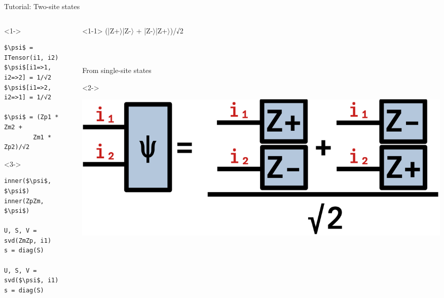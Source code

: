 \begin{frame}[fragile]{Tutorial: Two-site states}

\begin{columns}

\begin{column}{5cm}

\begin{onlyenv}<1->
\begin{lstlisting}[language=JuliaLocal, style=julia, mathescape, basicstyle=\small]
$\psi$ = ITensor(i1, i2)
$\psi$[i1=>1, i2=>2] = 1/√2
$\psi$[i1=>2, i2=>1] = 1/√2

$\psi$ = (Zp1 * Zm2 +
        Zm1 * Zp2)/√2
\end{lstlisting}
\end{onlyenv}

\begin{onlyenv}<3->
\begin{lstlisting}[language=JuliaLocal, style=julia, mathescape, basicstyle=\small]
inner($\psi$, $\psi$)
inner(ZpZm, $\psi$)

U, S, V = svd(ZmZp, i1)
s = diag(S)

U, S, V = svd($\psi$, i1)
s = diag(S)
\end{lstlisting}
\end{onlyenv}

\end{column}

\begin{column}{5cm}

\begin{onlyenv}<1-1>
(|Z+$\rangle$|Z-$\rangle$ + |Z-$\rangle$|Z+$\rangle$)/√2 \\
~\\
~\\
~\\
From single-site states \\
\end{onlyenv}

\begin{onlyenv}<2->
\vspace*{0.0cm}
\begin{center}
\includegraphics[width=1.0\textwidth]{
  slides/assets/cat12.png
}
\end{center}
\vspace*{0.0cm}
\end{onlyenv}


\end{column}
\end{columns}
\end{frame}
